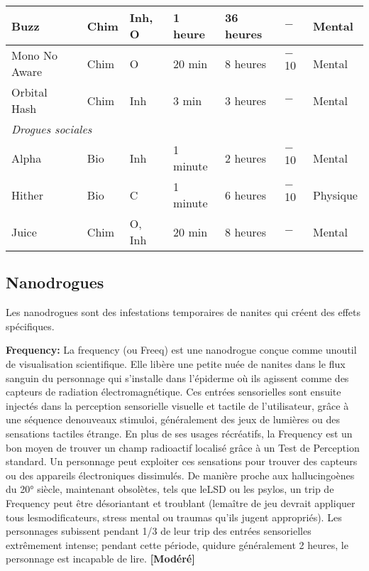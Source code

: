\begin{table}
\begin{tabularx}{\textwidth}{|X|l|l|l|l|X|X|}
Buzz	&Chim	&Inh, O	&1 heure	&36 heures	&$-$	&Mental	\\ \hline

Mono No Aware	&Chim	&O	&20 min	&8 heures	&$-$10	&Mental	\\ \hline

Orbital Hash	&Chim	&Inh	&3 min	&3 heures	&$-$	&Mental	\\ \hline

\multicolumn{7}{|l|}{\emph{Drogues sociales}}	\\ \hline

Alpha	&Bio	&Inh	&1 minute	&2 heures	&$-$10	&Mental	\\ \hline

Hither	&Bio	&C	&1 minute	&6 heures	&$-$10	&Physique	\\ \hline

Juice	&Chim	&O, Inh	&20 min	&8 heures	&$-$	&Mental	\\ \hline

\end{tabularx} \end{table} 

\clearpage

\label{tab:drugs} 

\subsection{Nanodrogues} \label{sec:nanodrugs} 

Les nanodrogues sont des infestations temporaires de nanites qui créent des effets spécifiques. 

\textbf{Frequency:} La frequency (ou Freeq) est une nanodrogue conçue comme unoutil de visualisation scientifique. Elle libère une petite nuée de nanites dans le flux sanguin du personnage qui s'installe dans l'épiderme où ils agissent comme des capteurs de radiation électromagnétique. Ces entrées sensorielles sont ensuite injectés dans la perception sensorielle visuelle et tactile de l'utilisateur, grâce à une séquence denouveaux stimuloi, généralement des jeux de lumières ou des sensations tactiles étrange. En plus de ses usages récréatifs, la Frequency est un bon moyen de trouver un champ radioactif localisé grâce à un Test de Perception standard. Un personnage peut exploiter ces sensations pour trouver des capteurs ou des appareils électroniques dissimulés. De manière proche aux hallucingoènes du 20° siècle, maintenant obsolètes, tels que leLSD ou les psylos, un trip de Frequency peut être désoriantant et troublant (lemaître de jeu devrait appliquer tous lesmodificateurs, stress mental ou traumas qu'ils jugent appropriés). Les personnages subissent pendant 1/3 de leur trip des entrées sensorielles extrêmement intense; pendant cette période, quidure généralement 2 heures, le personnage est incapable de lire. \textbf{[Modéré]} 

